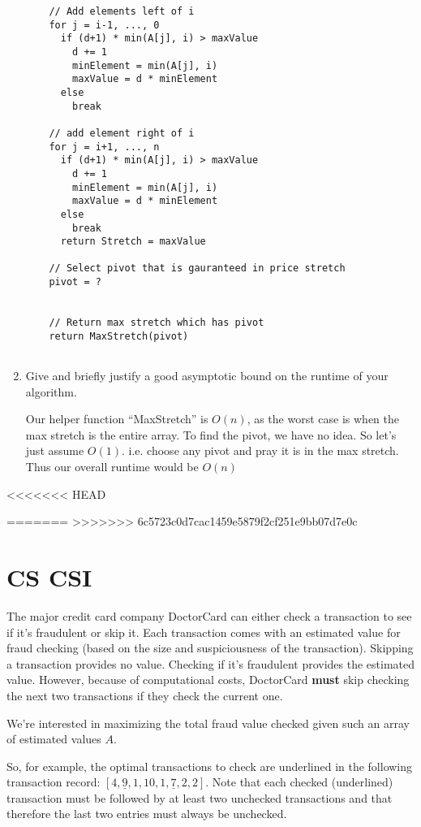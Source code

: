 \documentclass[11pt, oneside]{article}   	%
\theoremstyle{definition}
\theoremstyle{remark}
\begin{document}
\begin{enumerate}
\begin{verbatim}
    // Add elements left of i
    for j = i-1, ..., 0
      if (d+1) * min(A[j], i) > maxValue
        d += 1
        minElement = min(A[j], i)
        maxValue = d * minElement
      else
        break
        
    // add element right of i
    for j = i+1, ..., n
      if (d+1) * min(A[j], i) > maxValue
        d += 1
        minElement = min(A[j], i)
        maxValue = d * minElement
      else
        break   
      return Stretch = maxValue  
    
    // Select pivot that is gauranteed in price stretch
    pivot = ?
    
    
    // Return max stretch which has pivot
    return MaxStretch(pivot)
    

\end{verbatim}
\item Give and briefly justify a good asymptotic bound on the runtime of
   your algorithm.
   
   Our helper function ``MaxStretch'' is $O(n)$, as the worst case is when the max stretch is the entire array. To find the pivot, we have no idea. So let's just assume $O(1)$. i.e. choose any pivot and pray it is in the max stretch. Thus our overall runtime would be $O(n)$
\end{enumerate}
<<<<<<< HEAD




\cleardoublepage
=======
>>>>>>> 6c5723c0d7cac1459e5879f2cf251e9bb07d7e0c
\section{CS CSI}
\label{sec-2}

The major credit card company DoctorCard can either check a
transaction to see if it's fraudulent or skip it. Each transaction
comes with an estimated value for fraud checking (based on the size
and suspiciousness of the transaction). Skipping a transaction
provides no value. Checking if it's fraudulent provides the estimated
value. However, because of computational costs, DoctorCard \textbf{must} skip
checking the next two transactions if they check the current
one.

We're interested in maximizing the total fraud value checked given
such an array of estimated values $A$.

So, for example, the optimal transactions to check are underlined in
the following transaction record: $[4, \underline{9}, 1, 10, 1,
\underline{7}, 2, 2]$. Note that each checked (underlined) transaction
must be followed by at least two unchecked transactions and that
therefore the last two entries must always be unchecked.
\end{document}
